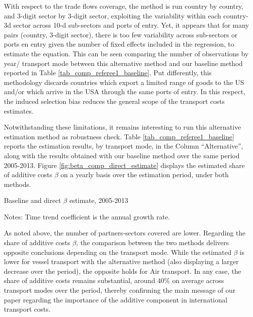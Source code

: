 \documentclass[11pt,twoside, authoryear]{elsarticle}
\begin{document}
With respect to the trade flows coverage, the method is run country by country, and 3-digit sector by 3-digit sector, exploiting the variability within each country-3d sector across 10-d sub-sectors and ports of entry. Yet, it appears that for many pairs (country, 3-digit sector), there is too few variability across sub-sectors or ports en entry given the number of fixed effects included in the regression, to estimate the equation. This can be seen comparing the number of observations by year/ transport mode between this alternative method and our baseline method reported in Table \ref{tab_comp_referee1_baseline}. Put differently, this methodology discards countries which export a limited range of goods to the US and/or which arrive in the USA through the same ports of entry. In this respect, the induced selection bias reduces the general scope of the transport costs estimates.

Notwithstanding these limitations, it remains interesting to run this alternative estimation method as robustness check. Table \ref{tab_comp_referee1_baseline} reports the estimation results, by transport mode, in the Column ``Alternative'', along with the results obtained with our baseline method over the same period 2005-2013. Figure \ref{fig:beta_comp_direct_estimate} displays the estimated share of additive costs $\beta$ on a yearly basis over the estimation period, under both methods.



\begin{table}[htbp]
	\caption{Baseline and direct $\beta$ estimate, 2005-2013}
	\begin{center}		
		
	
{\parbox[l]{12cm}{ \vspace{4pt}\footnotesize{Notes: Time trend coefficient is the annual growth rate.}}}
\end{center}
	\label{tab_comp_referee1_baseline}%
\end{table}%


As noted above, the number of partners-sectors covered are lower. Regarding the share of additive costs $\beta$, the comparison between the two methods delivers opposite conclusions depending on the transport mode. While the estimated $\beta$ is lower for vessel transport with the alternative method (also displaying a larger decrease over the period), the opposite holds for Air transport. In any case, the share of additive costs remains substantial, around 40\% on average across transport modes over the period, thereby confirming the main message of our paper regarding the importance of the additive component in international transport costs.
\end{document}
